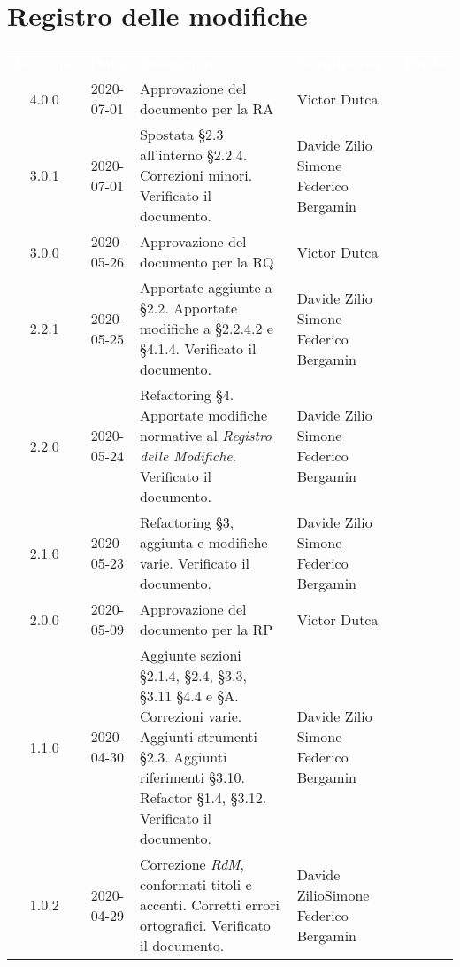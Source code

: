 \section*{Registro delle modifiche}
{
	\centering
	\begin{longtable}{ c c  C{4cm}  C{3.8cm}  C{3cm} }
		\textcolor{white}{\textbf{Versione}} & \textcolor{white}{\textbf{Data}} & \textcolor{white}{\textbf{Descrizione}} & \textcolor{white}{\textbf{Nominativo}} & \textcolor{white}{\textbf{Ruolo}}\\
		4.0.0 & 2020-07-01 & Approvazione del documento per la RA & Victor Dutca &\Res{}\\		
		3.0.1 & 2020-07-01 & Spostata \S 2.3 all'interno \S 2.2.4. Correzioni minori. Verificato il documento. & Davide Zilio \newline Simone Federico Bergamin & \adm{} \newline \ver{} \\
		3.0.0 & 2020-05-26 & Approvazione del documento per la RQ & Victor Dutca &\Res{}\\
		2.2.1 & 2020-05-25 & Apportate aggiunte a \S 2.2. Apportate modifiche a \S 2.2.4.2 e \S 4.1.4. Verificato il documento. & Davide Zilio \newline Simone Federico Bergamin & \adm{} \newline  \ver{} \\
		2.2.0 & 2020-05-24 & Refactoring \S 4. Apportate modifiche normative al \textit{Registro delle Modifiche}. Verificato il documento. & Davide Zilio \newline Simone Federico Bergamin & \adm{} \newline  \ver{} \\
	2.1.0 & 2020-05-23 & Refactoring \S 3, aggiunta e modifiche varie. Verificato il documento. & Davide Zilio \newline Simone Federico Bergamin & \adm{} \newline  \ver{} \\
	2.0.0 & 2020-05-09 & Approvazione del documento per la RP & Victor Dutca &\Res{}\\
	1.1.0 & 2020-04-30 & Aggiunte sezioni \S 2.1.4, \S 2.4, \S 3.3, \S 3.11 \S 4.4 e \S A. Correzioni varie. Aggiunti strumenti \S 2.3. Aggiunti riferimenti \S 3.10. Refactor \S 1.4, \S 3.12. Verificato il documento. & Davide Zilio \newline Simone Federico Bergamin&\adm{} \newline  \ver{}\\
	1.0.2 & 2020-04-29 & Correzione \textit{RdM}, conformati titoli e accenti. Corretti errori ortografici. Verificato il documento. & Davide Zilio\newline Simone Federico Bergamin &\adm{} \newline  \ver{}\\

\end{longtable}}
